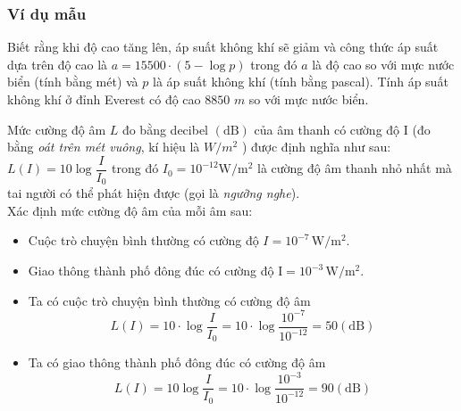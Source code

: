 \subsubsection{Ví dụ mẫu}
\begin{vd} %
	Biết rằng khi độ cao tăng lên, áp suất không khí sẽ giảm và công thức áp suất dựa trên độ cao là
	$a=15500 \cdot (5-\log p)$
	trong đó $a$ là độ cao so với mực nước biển (tính bằng mét) và $p$ là áp suất không khí (tính bằng pascal).
	Tính áp suất không khí ở đỉnh Everest có độ cao $8850$ $m$ so với mực nước biển.
\end{vd}
\begin{vd}  %
	Mức cường độ âm $L$ đo bằng decibel $(\mathrm{dB})$ của âm thanh có cường độ I (đo bằng \textit{oát trên mét vuông}, kí hiệu là $W / m^2$ ) được định nghĩa như sau:
	$L(I)=10 \log \dfrac{I}{I_0}$
	trong đó $I_0=10^{-12} \mathrm{W}/\mathrm{m}^2$ là cường độ âm thanh nhỏ nhất mà tai người có thể phát hiện được (gọi là \textit{ngưỡng nghe}).\\
	Xác định mức cường độ âm của mỗi âm sau:
	\begin{itemize}
		\item Cuộc trò chuyện bình thường có cường độ $I=10^{-7} \,\mathrm{W}/ \mathrm{m}^2$.
		\item Giao thông thành phố đông đúc có cường độ $\mathrm{I}=10^{-3} \, \mathrm{W}/\mathrm{m}^2$.
	\end{itemize}
	\loigiai
	{\begin{itemize}
			\item	Ta có cuộc trò chuyện bình thường có cường độ âm 
			\begin{equation*}
				L(I)=10 \cdot \log \dfrac{I}{{I_0}}=10 \cdot \log \dfrac{{10^{-7}}}{{10^{-12}}}=50{(\mathrm{dB})}
			\end{equation*}
			\item Ta có giao thông thành phố đông đúc có cường độ âm
			\begin{equation*} L(I)=10\log \dfrac{I}{{I_0}}=10 \cdot \log \dfrac{10^{-3}}{10^{-12}}=90{(\mathrm{dB})}
			\end{equation*}
	\end{itemize}}
\end{vd}
